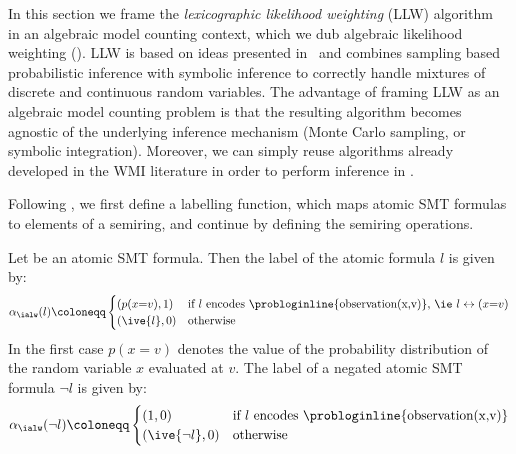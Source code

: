 
In this section we frame the {\em lexicographic likelihood weighting} (LLW) algorithm~\citep{wu2018discrete} in an algebraic model counting context, which we dub algebraic likelihood weighting (\ialw). LLW is based on ideas presented in~\citep{nitti2016probabilistic} and combines sampling based probabilistic inference with symbolic inference to correctly handle mixtures of discrete and continuous random variables. The advantage of framing LLW  as an algebraic model counting problem is that the resulting algorithm becomes agnostic of the underlying inference mechanism (\eg Monte Carlo sampling, or symbolic integration). Moreover, we can simply reuse algorithms already developed in the WMI literature in order to perform inference in \dcproblogsty.

Following \citet{kimmig2017algebraic}, we first define a labelling function, which maps atomic SMT formulas to elements of a semiring, and continue by defining the semiring operations.

\begin{definition}
	\label{def:label_alpha_alw}
	Let be an atomic SMT formula. Then the label of the atomic formula $l$ is given by:
	\begin{align*}
		\alpha_{\ialw}(l) \coloneqq 
		\begin{cases}
			(p(x{=}v),1) & \text{if $l$ encodes \probloginline{observation(x,v)}, \ie $l\leftrightarrow (x{=}v)$} \\
			(\ive{l},0) & \text{otherwise} 
		\end{cases}
	\end{align*}
    In the first case $p(x{=}v)$ denotes the value of the probability distribution of the random variable $x$ evaluated at $v$.
	The label of a negated atomic SMT formula $ \neg l$ is given by:
	\begin{align*}
		\alpha_{\ialw}(\neg l) \coloneqq 
		\begin{cases}
			(1,0) & \text{if $l$ encodes \probloginline{observation(x,v)}}\\
			(\ive{\neg l},0) & \text{otherwise} 
		\end{cases}
	\end{align*}
\end{definition}

